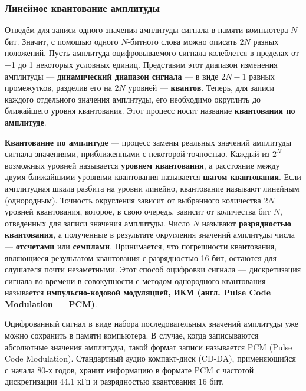 \documentclass[a4paper]{report}
\begin{document}
\subsubsection{Линейное квантование амплитуды}
Отведём для записи одного значения амплитуды сигнала в памяти компьютера $N$ бит. Значит, с помощью одного $N$-битного слова можно описать $2N$ разных положений. Пусть амплитуда оцифровываемого сигнала колеблется в пределах от −1 до 1 некоторых условных единиц. Представим этот диапазон изменения амплитуды — \textbf{динамический диапазон сигнала} — в виде $2N−1$ равных промежутков, разделив его на $2N$ уровней — \textbf{квантов}. Теперь, для записи каждого отдельного значения амплитуды, его необходимо округлить до ближайшего уровня квантования. Этот процесс носит название \textbf{квантования по амплитуде}.

\textbf{Квантование по амплитуде} — процесс замены реальных значений амплитуды сигнала значениями, приближенными с некоторой точностью. Каждый из $2^N$ возможных уровней называется \textbf{уровнем квантования}, а расстояние между двумя ближайшими уровнями квантования называется \textbf{шагом квантования}. Если амплитудная шкала разбита на уровни линейно, квантование называют линейным (однородным).
Точность округления зависит от выбранного количества $2N$ уровней квантования, которое, в свою очередь, зависит от количества бит $N$, отведенных для записи значения амплитуды. Число $N$ называют \textbf{разрядностью квантования}, а полученные в результате округления значений амплитуды числа — \textbf{отсчетами} или \textbf{семплами}. Принимается, что погрешности квантования, являющиеся результатом квантования с разрядностью 16 бит, остаются для слушателя почти незаметными. Этот способ оцифровки сигнала — дискретизация сигнала во времени в совокупности с методом однородного квантования — называется \textbf{импульсно-кодовой модуляцией, ИКМ (англ. Pulse Code Modulation — PCM)}.

Оцифрованный сигнал в виде набора последовательных значений амплитуды уже можно сохранить в памяти компьютера. В случае, когда записываются абсолютные значения амплитуды, такой формат записи называется PCM (Pulse Code Modulation). Стандартный аудио компакт-диск (CD-DA), применяющийся с начала 80-х годов, хранит информацию в формате PCM с частотой дискретизации 44.1 кГц и разрядностью квантования 16 бит.  
\end{document}
